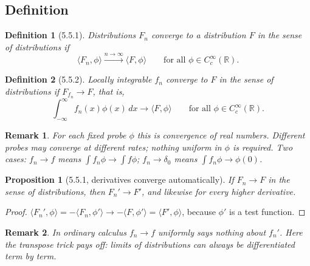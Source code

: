 \documentclass{article}
\newtheorem{definition}{Definition}
\newtheorem{remark}{Remark}
\newtheorem{proposition}{Proposition}
\newcommand{\R}{\mathbb{R}}
\newcommand{\D}{C_c^\infty(\R)}
\newcommand{\ip}[2]{\langle #1, #2 \rangle}
\begin{document}
\subsection{Definition}
\begin{definition}[5.5.1]
    Distributions $F_n$ converge to a distribution $F$ \emph{in the sense of distributions} if
    \begin{equation}
        \ip{F_n}{\phi} \xrightarrow{n\to\infty} \ip{F}{\phi} \qquad \text{for all } \phi \in \D.
    \end{equation}
\end{definition}
\begin{definition}[5.5.2]
    Locally integrable $f_n$ converge to $F$ in the sense of distributions if $F_{f_n} \to F$, that is,
    \begin{equation}
        \int_{-\infty}^\infty f_n(x)\phi(x)\,dx \to \ip{F}{\phi} \qquad \text{for all } \phi \in \D.
    \end{equation}
\end{definition}
\begin{remark}
    For each fixed probe $\phi$ this is convergence of real numbers. Different probes may converge at different rates; nothing uniform in $\phi$ is required. Two cases: $f_n \to f$ means $\int f_n\phi \to \int f\phi$; $f_n \to \delta_0$ means $\int f_n\phi \to \phi(0)$.
\end{remark}
\begin{proposition}[5.5.1, derivatives converge automatically]
    If $F_n \to F$ in the sense of distributions, then $F_n' \to F'$, and likewise for every higher derivative.
\end{proposition}
\begin{proof}
    $\ip{F_n'}{\phi} = -\ip{F_n}{\phi'} \to -\ip{F}{\phi'} = \ip{F'}{\phi}$, because $\phi'$ is a test function.
\end{proof}
\begin{remark}
    In ordinary calculus $f_n \to f$ uniformly says nothing about $f_n'$. Here the transpose trick pays off: limits of distributions can always be differentiated term by term.
\end{remark}
\end{document}
